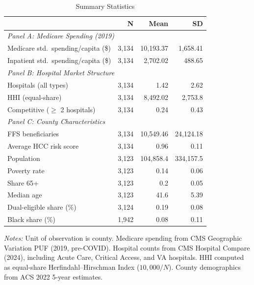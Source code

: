 \begin{table}[t]
\centering
\begin{threeparttable}
\caption{Summary Statistics}
\label{tab:summary}
\begin{tabular}{lrrr}
\toprule
 & N & Mean & SD \\
\midrule
\multicolumn{4}{l}{\textit{Panel A: Medicare Spending (2019)}} \\
Medicare std.\ spending/capita (\$) & 3,134 & 10,193.37 & 1,658.41 \\
Inpatient std.\ spending/capita (\$) & 3,134 & 2,702.02 & 488.65 \\
\midrule
\multicolumn{4}{l}{\textit{Panel B: Hospital Market Structure}} \\
Hospitals (all types) & 3,134 & 1.42 & 2.62 \\
HHI (equal-share) & 3,134 & 8,492.02 & 2,753.8 \\
Competitive ($\geq$ 2 hospitals) & 3,134 & 0.24 & 0.43 \\
\midrule
\multicolumn{4}{l}{\textit{Panel C: County Characteristics}} \\
FFS beneficiaries & 3,134 & 10,549.46 & 24,124.18 \\
Average HCC risk score & 3,134 & 0.96 & 0.11 \\
Population & 3,123 & 104,858.4 & 334,157.5 \\
Poverty rate & 3,123 & 0.14 & 0.06 \\
Share 65+ & 3,123 & 0.2 & 0.05 \\
Median age & 3,123 & 41.6 & 5.39 \\
Dual-eligible share (\%) & 3,124 & 0.19 & 0.08 \\
Black share (\%) & 1,942 & 0.08 & 0.11 \\
\bottomrule
\end{tabular}
\begin{tablenotes}[flushleft]
\item \textit{Notes:} Unit of observation is county. Medicare spending from CMS Geographic Variation PUF (2019, pre-COVID). Hospital counts from CMS Hospital Compare (2024), including Acute Care, Critical Access, and VA hospitals. HHI computed as equal-share Herfindahl--Hirschman Index ($10{,}000/N$). County demographics from ACS 2022 5-year estimates.
\end{tablenotes}
\end{threeparttable}
\end{table}
